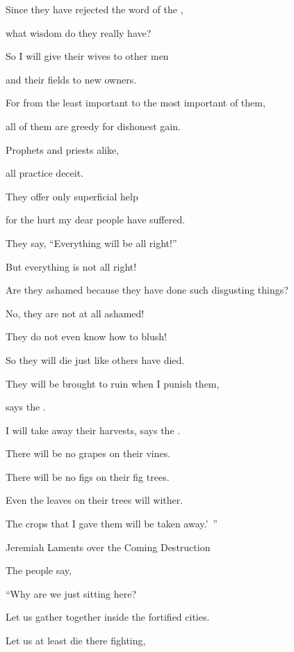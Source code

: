 {\par }{\Q Since
they
have rejected
the word
of the {},
\par }{\Q what
wisdom do they really have?
\par }{\Q So
I will give
their wives
to other
men
\par }{\Q and their
fields
to new owners.
\par }{\Q For
from the least
important
to the most important
of them,
\par }{\Q all
of them are greedy
for dishonest gain.
\par }{\Q Prophets
and priests
alike,
\par }{\Q all
practice
deceit.
\par }{\Q {}They offer only superficial
help
\par }{\Q for the hurt my dear
people
have suffered.
\par }{\Q They say,
“Everything will be all right!”
\par }{\Q But everything
is not
all right!
\par }{\Q {}Are they ashamed
because
they have done
such
disgusting things?
\par }{\Q No, they are not
at all ashamed!
\par }{\Q They do not
even know
how to blush!
\par }{\Q So
they will die
just like
others have died.
\par }{\Q They will be brought to ruin
when
I punish
them,
\par }{\Q says
the {}.
\par }{\Q {}I will take away
their harvests, says
the
{}.
\par }{\Q There will be no
grapes
on their vines.
\par }{\Q There will be no
figs
on their fig trees.
\par }{\Q Even the leaves
on their trees will wither.
\par }{\Q The crops that I gave
them
will be taken away.’ ”
\par }{\SH Jeremiah Laments over the Coming Destruction
\par }{\PP {}The people say,

\par }{\Q “Why
are we
just sitting
here?
\par }{\Q Let us gather together
inside
the fortified
cities.
\par }{\Q Let us at least die
there
fighting,

}
